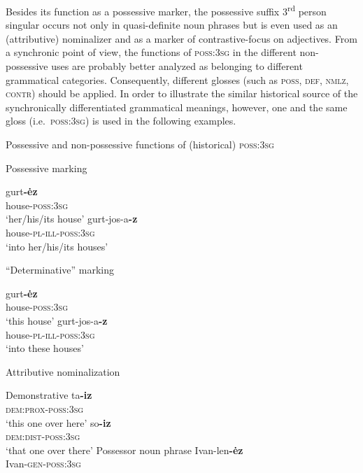 Besides its function as a possessive marker, the possessive suffix 3\textsuperscript{rd} person singular occurs not only in quasi-definite noun phrases but is even used as an (attributive) nominalizer and as a marker of contrastive-focus on adjectives. From a synchronic point of view, the functions of \textsc{poss:3sg} in the different non-possessive uses are probably better analyzed as belonging to different grammatical categories. Consequently, different glosses (such as \textsc{poss, def, nmlz, contr}) should be applied. In order to illustrate the similar historical source of the synchronically differentiated grammatical meanings, however, one and the same gloss (i.e.~\textsc{poss:3sg}) is used in the following examples.
\begin{exe}
\ex Possessive and non-possessive functions of (historical) \textsc{poss:3sg}
\begin{xlist}
\ex Possessive marking \label{udmurt possmarking}
\begin{xlist}
\ex	
\gll	gurt\textbf{-ėz}\\
	house-\textsc{poss:3sg}\\
\glt	‘her/his/its house’
\ex	
\gll	gurt-jos-a\textbf{-z}\\
	house-\textsc{pl}-\textsc{ill}-\textsc{poss:3sg}\\
\glt	‘into her/his/its houses’
\end{xlist}
\ex “Determinative” marking
\begin{xlist}
\ex	
\gll	gurt\textbf{-ėz}\\
	house-\textsc{poss:3sg}\\
\glt	‘this house’
\ex	
\gll	gurt-jos-a\textbf{-z}\\
	house-\textsc{pl}-\textsc{ill}-\textsc{poss:3sg}\\
\glt	‘into these houses’
\end{xlist}
\ex	Attributive nominalization \label{udmurt diachr nomzr}
\begin{xlist}
\ex Demonstrative \label{udmurt diachr dem-nomzr}
\gll	ta\textbf{-iz}\\
 	\textsc{dem:prox}-\textsc{poss:3sg}\\
\glt	‘this one over here’
\gll	so\textbf{-iz}\\
 	\textsc{dem:dist}-\textsc{poss:3sg}\\
\glt	‘that one over there’
\ex 	Possessor noun phrase \label{udmurt diachr gen-nomzr}
\gll	Ivan-len\textbf{-ėz}\\
	Ivan-\textsc{gen}-\textsc{poss:3sg}\\

\end{xlist}
\end{xlist}
\end{exe}
